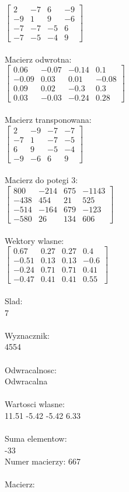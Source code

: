\documentclass[a4paper,12pt]{article}
\begin{document}
$\begin{bmatrix} 2&-7&6&-9\\-9&1&9&-6\\-7&-7&-5&6\\-7&-5&-4&9 \end{bmatrix}$
\\
\\
Macierz odwrotna:\\

$\begin{bmatrix} 0.06&-0.07&-0.14&0.1\\-0.09&0.03&0.01&-0.08\\0.09&0.02&-0.3&0.3\\0.03&-0.03&-0.24&0.28 \end{bmatrix}$
\\
\\
Macierz transponowana:\\

$\begin{bmatrix} 2&-9&-7&-7\\-7&1&-7&-5\\6&9&-5&-4\\-9&-6&6&9 \end{bmatrix}$
\\
\\
Macierz do potegi 3:\\

$\begin{bmatrix} 800&-214&675&-1143\\-438&454&21&525\\-514&-164&679&-123\\-580&26&134&606 \end{bmatrix}$
\\
\\
Wektory wlasne:\\

$\begin{bmatrix} 0.67&0.27&0.27&0.4\\-0.51&0.13&0.13&-0.6\\-0.24&0.71&0.71&0.41\\-0.47&0.41&0.41&0.55 \end{bmatrix}$
\\
\\
Slad:\\
7
\\
\\
Wyznacznik:\\
4554
\\
\\
Odwracalnosc:\\
Odwracalna
\\
\\
Wartosci wlasne:\\
11.51 -5.42 -5.42 6.33
\\
\\
Suma elementow:\\
-33
\\
\newpage
Numer macierzy:
667
\\
\\
Macierz:\\
\end{document}
